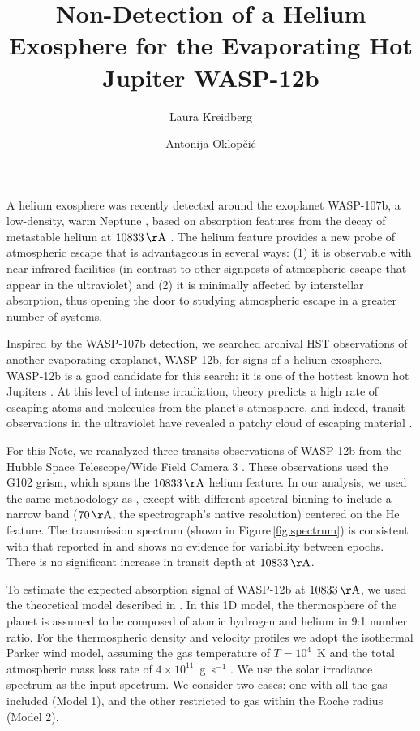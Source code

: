 \documentclass[RNAAS]{aastex62}
\begin{document}
\title{Non-Detection of a Helium Exosphere for the Evaporating Hot Jupiter WASP-12b}


\author{Laura Kreidberg}

\author{Antonija Oklop\v{c}i\'{c}}
A helium exosphere was recently detected around the exoplanet WASP-107b, a
low-density, warm Neptune \citep{spake18}, based on absorption features from the decay
of metastable helium at $10833\,\mathrm{\AA}$ \citep[predicted
by][]{seager00,oklopcic18}. The helium feature provides a new probe of atmospheric escape that is
advantageous in several ways: (1) it is observable with near-infrared facilities
(in contrast to other signposts of atmospheric escape that appear in the
ultraviolet) and (2) it is minimally affected by interstellar absorption, thus opening the door to studying atmospheric escape in a greater number of systems.

Inspired by the WASP-107b detection, we searched archival HST observations of
another evaporating exoplanet, WASP-12b, for signs of a helium exosphere. WASP-12b is a good
candidate for this search: it is one of the hottest known hot
Jupiters \citep[$T_\mathrm{eq} = 2500$ K;][]{hebb09}. At this level of intense irradiation, theory predicts a high rate of escaping atoms and molecules from the planet's atmosphere, and indeed, transit observations in the ultraviolet have revealed a patchy cloud of escaping material \citep{nichols15}.  

For this Note, we reanalyzed three transits observations of WASP-12b from the
Hubble Space Telescope/Wide Field Camera 3 \citep[originally published in][]{kreidberg15b}. These observations used the G102 grism, which spans the
$10833\,\mathrm{\AA}$ helium feature. In our analysis, we used the same methodology as
\cite{kreidberg15b}, except with different spectral binning to include a narrow
band ($70\,\mathrm{\AA}$, the spectrograph's native resolution) centered on the He feature.  
The transmission spectrum (shown in Figure\,\ref{fig:spectrum}) is consistent with that reported in
\cite{kreidberg15b} and shows no evidence for variability between epochs. There
is no significant increase in transit depth at $10833\,\mathrm{\AA}$.  

To estimate the expected absorption signal of WASP-12b at $10833\,\mathrm{\AA}$,
we used the theoretical model described in \cite{oklopcic18}.
In this 1D model, the thermosphere of the planet is assumed to be composed of atomic hydrogen and helium in 9:1 number
ratio. For the thermospheric density and velocity profiles we adopt the
isothermal Parker wind model, assuming the gas temperature of $T=10^4$~K and the
total atmospheric mass loss rate of $4\times 10^{11}$~g~s$^{-1}$ \citep[based on
the results of hydrodynamic simulations of atmospheric escape in WASP-12b
by][]{salz16}. We use the solar irradiance spectrum as the input spectrum. We
consider two cases: one with all the gas included (Model 1), and the other
restricted to gas within the Roche radius (Model 2).
\end{document}
